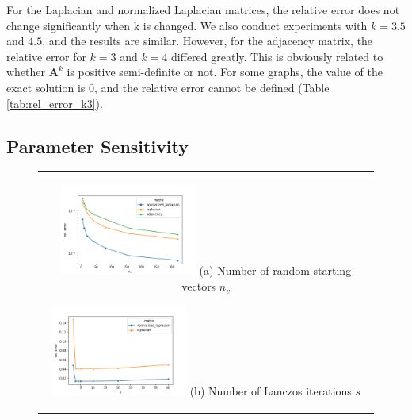 \documentclass[senior,final,11pt]{iscs-thesis}
\begin{document}
For the Laplacian and normalized Laplacian matrices, the relative error does not change significantly when k is changed. We also conduct experiments with $k = 3.5$ and $4.5$, and the results are similar. However, for the adjacency matrix, the relative error for $k=3$ and $k=4$ differed greatly. This is obviously related to whether ${\mathbf A}^k$ is positive semi-definite or not. For some graphs, the value of the exact solution is 0, and the relative error cannot be defined (Table \ref{tab:rel_error_k3}).

\subsection{Parameter Sensitivity}

\begin{figure}[htbp]
    \begin{center}
      \begin{tabular}{c}
        \begin{minipage}{0.33\hsize}
            \begin{center}
              \includegraphics[clip, width=4.5cm]{./figure/plot_param_nv.png}
              \hspace{1.6cm} (a) Number of random starting vectors $n_v$
            \end{center}
        \end{minipage}
        \begin{minipage}{0.33\hsize}
          \begin{center}
            \includegraphics[clip, width=4.5cm]{./figure/plot_param_s.png}
            \hspace{1.6cm} (b) Number of Lanczos iterations $s$
          \end{center}
        \end{minipage}
        \begin{minipage}{0.33\hsize}

\end{minipage}
\end{tabular}
\end{center}
\end{figure}
\end{document}
